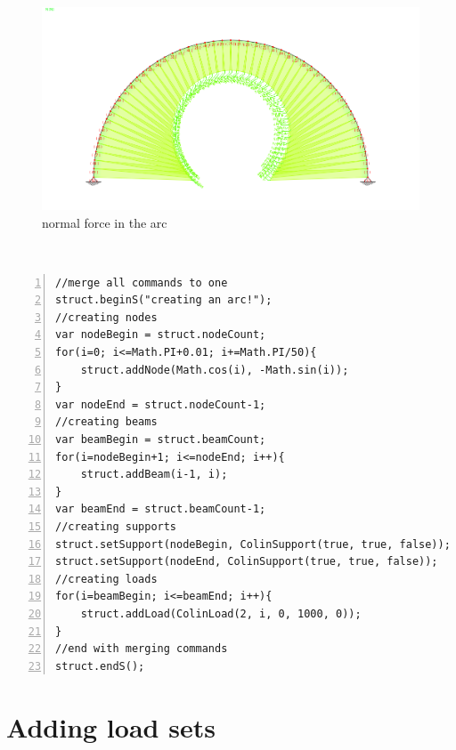\begin{figure}[H]
\begin{center}
\includegraphics[width=\textwidth]{../pictures/scriptresult.png}
\caption{normal force in the arc}
\label{pic:scriptresult}
\end{center}
\end{figure}
\vspace{20pt}\\

\begin{lstlisting}[frame=single, basicstyle=\small, label=lst:structcreation, caption=creating a structure, numbers=left, firstnumber=1, tabsize=3]
//merge all commands to one
struct.beginS("creating an arc!");
//creating nodes
var nodeBegin = struct.nodeCount;
for(i=0; i<=Math.PI+0.01; i+=Math.PI/50){
	struct.addNode(Math.cos(i), -Math.sin(i));
}
var nodeEnd = struct.nodeCount-1;
//creating beams
var beamBegin = struct.beamCount;
for(i=nodeBegin+1; i<=nodeEnd; i++){
	struct.addBeam(i-1, i);
}
var beamEnd = struct.beamCount-1;
//creating supports
struct.setSupport(nodeBegin, ColinSupport(true, true, false));
struct.setSupport(nodeEnd, ColinSupport(true, true, false));
//creating loads
for(i=beamBegin; i<=beamEnd; i++){
	struct.addLoad(ColinLoad(2, i, 0, 1000, 0));
}
//end with merging commands
struct.endS();
\end{lstlisting}

\section{Adding load sets}

